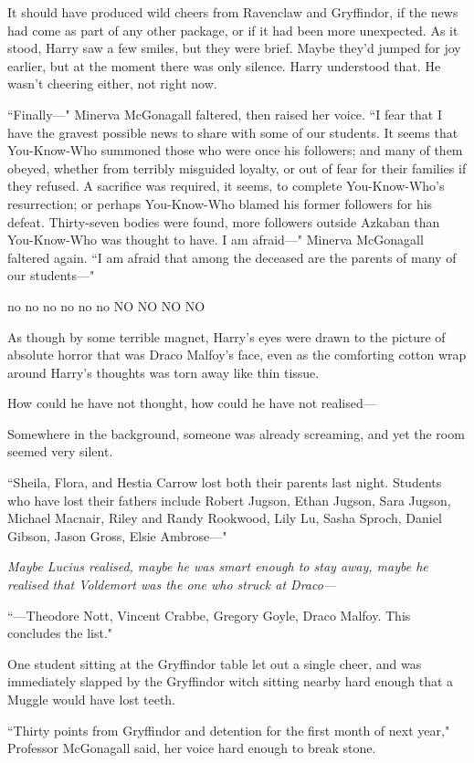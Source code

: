 It should have produced wild cheers from Ravenclaw and Gryffindor, if the news had come as part of any other package, or if it had been more unexpected. As it stood, Harry saw a few smiles, but they were brief. Maybe they'd jumped for joy earlier, but at the moment there was only silence. Harry understood that. He wasn't cheering either, not right now.

``Finally—" Minerva McGonagall faltered, then raised her voice. ``I fear that I have the gravest possible news to share with some of our students. It seems that You-Know-Who summoned those who were once his followers; and many of them obeyed, whether from terribly misguided loyalty, or out of fear for their families if they refused. A sacrifice was required, it seems, to complete You-Know-Who's resurrection; or perhaps You-Know-Who blamed his former followers for his defeat. Thirty-seven bodies were found, more followers outside Azkaban than You-Know-Who was thought to have. I am afraid—" Minerva McGonagall faltered again. ``I am afraid that among the deceased are the parents of many of our students—"

no no no no no no NO NO NO NO

As though by some terrible magnet, Harry's eyes were drawn to the picture of absolute horror that was Draco Malfoy's face, even as the comforting cotton wrap around Harry's thoughts was torn away like thin tissue.

How could he have not thought, how could he have not realised—

Somewhere in the background, someone was already screaming, and yet the room seemed very silent.

``Sheila, Flora, and Hestia Carrow lost both their parents last night. Students who have lost their fathers include Robert Jugson, Ethan Jugson, Sara Jugson, Michael Macnair, Riley and Randy Rookwood, Lily Lu, Sasha Sproch, Daniel Gibson, Jason Gross, Elsie Ambrose—"

\emph{Maybe Lucius realised, maybe he was smart enough to stay away, maybe he realised that Voldemort was the one who struck at Draco—}

``—Theodore Nott, Vincent Crabbe, Gregory Goyle, Draco Malfoy. This concludes the list."

One student sitting at the Gryffindor table let out a single cheer, and was immediately slapped by the Gryffindor witch sitting nearby hard enough that a Muggle would have lost teeth.

``Thirty points from Gryffindor and detention for the first month of next year," Professor McGonagall said, her voice hard enough to break stone.

